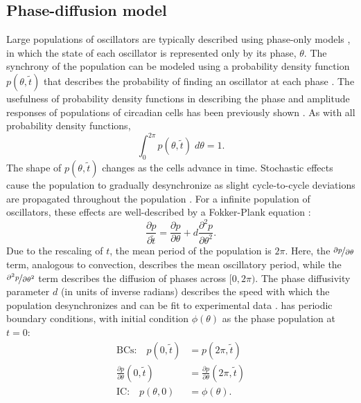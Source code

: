 \subsection{Phase-diffusion model}
Large populations of oscillators are typically described using phase-only models \cite{Rougemont2006}, in which the state of each oscillator is represented only by its phase, $\theta$.
The synchrony of the population can be modeled using a probability density function $p(\theta, \tilde{t})$ that describes the probability of finding an oscillator at each phase \cite{Kuramoto1984}.
The usefulness of probability density functions in describing the phase and amplitude responses of populations of circadian cells has been previously shown \cite{Ukai2007}.
As with all probability density functions,
\begin{equation}
  \int_0^{2\pi} p(\theta, \tilde{t}) \; d\theta = 1.
\end{equation}
The shape of $p(\theta, \tilde{t})$ changes as the cells advance in time.
Stochastic effects cause the population to gradually desynchronize as slight cycle-to-cycle deviations are propagated throughout the population \cite{Teramae2004}.
For a infinite population of oscillators, these effects are well-described by a Fokker-Plank equation \cite{Stein1965}:
\begin{equation}
  \frac{\partial p}{\partial \tilde{t}} = \frac{\partial p}{\partial \theta} + d\frac{\partial^2 p}{\partial \theta^2}.
  \label{eq:pde}
\end{equation}
Due to the rescaling of $t$, the mean period of the population is $2\pi$.
Here, the $\nicefrac{\partial p}{\partial \theta}$ term, analogous to convection, describes the mean oscillatory period, while the $\nicefrac{\partial^2 p}{\partial \theta^2}$ term describes the diffusion of phases across $[0, 2\pi)$.
The phase diffusivity parameter $d$ (in units of inverse radians) describes the speed with which the population desynchronizes and can be fit to experimental data \cite{Rougemont2007}.
 has periodic boundary conditions, with initial condition $\phi(\theta)$ as the phase population at $t=0$:
\begin{align}
  \text{BCs:}\quad p(0, \tilde{t}) &= p(2\pi, \tilde{t}) \\
  \frac{\partial p}{\partial \theta}(0, \tilde{t}) &= \frac{\partial p}{\partial \theta}(2\pi, \tilde{t}) \\
  \text{IC:}\quad p(\theta, 0) &= \phi(\theta).
  \label{eq:pde_ic}
\end{align}
